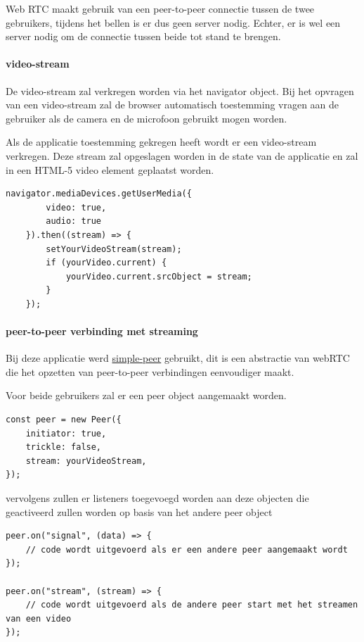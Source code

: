 		Web RTC maakt gebruik van een peer-to-peer connectie tussen de twee gebruikers, tijdens het bellen is er dus geen server nodig. Echter, er is wel een server nodig om de connectie tussen beide tot stand te brengen.
		
		\paragraph{video-stream}
			De video-stream zal verkregen worden via het navigator object. Bij het opvragen van een video-stream zal de browser automatisch toestemming vragen aan de gebruiker als de camera en de microfoon gebruikt mogen worden.
			
			Als de applicatie toestemming gekregen heeft wordt er een video-stream verkregen.
			Deze stream zal opgeslagen worden in de state van de applicatie en zal in een HTML-5 video element geplaatst worden.
		
\begin{lstlisting}
navigator.mediaDevices.getUserMedia({ 
		video: true,
		audio: true 
	}).then((stream) => {
		setYourVideoStream(stream);
		if (yourVideo.current) {
			yourVideo.current.srcObject = stream;
		}
	});
\end{lstlisting}


		\paragraph{peer-to-peer verbinding met streaming}
			Bij deze applicatie werd \href{https://github.com/feross/simple-peer}{simple-peer} gebruikt, dit is een abstractie van webRTC die het opzetten van peer-to-peer verbindingen eenvoudiger maakt.
			
			Voor beide gebruikers zal er een peer object aangemaakt worden.

\begin{lstlisting}
const peer = new Peer({
	initiator: true,
	trickle: false,
	stream: yourVideoStream,
});
\end{lstlisting}
			
			vervolgens zullen er listeners toegevoegd worden aan deze objecten die geactiveerd zullen worden op basis van het andere peer object
			
\begin{lstlisting}
peer.on("signal", (data) => {
	// code wordt uitgevoerd als er een andere peer aangemaakt wordt
});

peer.on("stream", (stream) => {
	// code wordt uitgevoerd als de andere peer start met het streamen van een video
});
\end{lstlisting}

